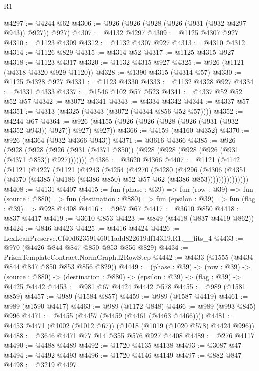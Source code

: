 \begin{lexlean}{R1}
\begin{coremodule}
@4297 := @4244 @62
@4306 := @926 (@926 (@928 (@926 (@931 (@932 @4297 @943)) @927)) @927)
@4307 := @4132 @4297
@4309 := @1125 @4307 @927
@4310 := @1123 @4309
@4312 := @1132 @4307 @927
@4313 := @4310 @4312
@4314 := @1126 @829
@4315 := @4314 @52
@4317 := @1125 @4315 @927
@4318 := @1123 @4317
@4320 := @1132 @4315 @927
@4325 := @926 (@1121 (@4318 @4320 @929 @1120))
@4328 := @1390 @4315 (@4314 @57)
@4330 := @1125 @4328 @927
@4331 := @1123 @4330
@4333 := @1132 @4328 @927
@4334 := @4331 @4333
@4337 := @1546 @102 @57 @523
@4341 := @4337 @52 @52 @52 @57
@4342 := @3072 @4341
@4343 := @4334 @4342
@4344 := @4337 @57
@4351 := @4313 (@4325 (@4343 (@3072 (@4344 @856 @52 @57))))
@4352 := @4244 @67
@4364 := @926 (@4155 (@926 (@926 (@928 (@926 (@931 (@932 @4352 @943)) @927)) @927) @927))
@4366 := @4159 (@4160 @4352)
@4370 := @926 (@4364 (@932 @4366 @943))
@4371 := @3616 @4366
@4385 := @926
    (@928 (@928 (@926 (@931 (@4371 @850)) (@928 (@928 (@928 (@926 (@931 (@4371 @853)) @927)))))))
@4386 := @3620 @4366
@4407 := @1121
    (@4142
      (@1121
        (@4227
          (@1121
            (@4243
              (@4254
                (@4270
                  (@4280
                    (@4296
                      (@4306
                        (@4351
                          (@4370 (@4385 (@4186 (@4386 @850) @52 @57 @62 (@4386 @853)))))))))))))))
@4408 := @4131 @4407
@4415 := fun (phase : @39) =>
  fun (row : @39) =>
  fun (source : @880) =>
  fun (destination : @880) => fun (epsilon : @39) => fun (flag : @39) => @928 @4408
@4416 := @967 @67
@4417 := @3610 @850
@4418 := @837 @4417
@4419 := @3610 @853
@4423 := @849 (@4418 (@837 @4419 @862))
@4424 := @846 @4423
@4425 := @4416 @4424
@4426 := LexLeanPreserve.Cf40d62359146011add822619df143ff9.R1.__fits_4
@4433 := @970 (@4426 @844 @847 @850 @853 @856 @829)
@4434 := PrismTemplateContract.NormGraph.l2RowStep
@4442 := @4433 (@1555 (@4434 @844 @847 @850 @853 @856 @829))
@4449 := (phase : @39) ->
  (row : @39) ->
  (source : @880) -> (destination : @880) -> (epsilon : @39) -> (flag : @39) -> @4425 @4442
@4453 := @981 @67 @4424 @4442 @578
@4455 := @989 (@1581 @859)
@4457 := @989 (@1584 @857)
@4459 := @989 (@1587 @4419)
@4461 := @989 (@1590 @4417)
@4463 := @989 (@1172 @848)
@4466 := @989 (@993 @845) @996
@4471 := @4455 (@4457 (@4459 (@4461 (@4463 @4466))))
@4481 := @4453 @4471 (@1002 (@1012 @67)) (@1018 (@1019 (@1020 @578) @4424 @996))
@4488 := @3646 @4471 @77 @14 @355 @576 @927 @4408
@4489 := @276 @4117
@4490 := @4488 @4489
@4492 := @1720 @4135 @4138
@4493 := @3087 @47
@4494 := @4492 @4493
@4496 := @1720 @4146 @4149
@4497 := @882 @847
@4498 := @3219 @4497

\end{coremodule}
\end{lexlean}
